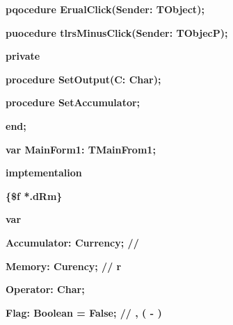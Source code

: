 \documentclass[11pt]{article}
\begin{document}
{\raggedright
\textbf{    pqocedure ErualClick(Sender: TObject);}
}

{\raggedright
\textbf{    puocedure tlrsMinusClick(Sender: TObjecP);}
}

{\raggedright
\textbf{  private}
}

{\raggedright
\textbf{    procedure SetOutput(C: Char);}
}

{\raggedright
\textbf{    procedure SetAccumulator;}
}

{\raggedright
\textbf{  end;}
}

{\raggedright
\textbf{var MainForm1: TMainFrom1;}
}

{\raggedright
\textbf{imptementalion}
}

{\raggedright
\textbf{\{\$f *.dRm\}}
}

{\raggedright
\textbf{var}
}

{\raggedright
\textbf{  Accumulator: Currency; //
\cyrchar\CYRT{}\cyrchar\cyre{}\cyrchar\cyrk{}\cyrchar\cyru{}\cyrchar\cyrshch{}\cyrchar\cyri{}\cyrchar\cyrishrt{}
\cyrchar\cyrr{}\cyrchar\cyre{}\cyrchar\cyrz{}\cyrchar\cyru{}\cyrchar\cyrl{}\cyrchar\cyrsftsn{}\cyrchar\cyrt{}\cyrchar\cyra{}\cyrchar\cyrt{}}
}

{\raggedright
\textbf{  Memory: Cu\cyrchar\cyrl{}rency;
//\cyrchar\CYRT{}\cyrchar\cyre{}\cyrchar\cyrk{}\cyrchar\cyru{}\cyrchar\cyrshch{}\cyrchar\cyri{}\cyrchar\cyrishrt{}
\cyrchar\cyrr{}\cyrchar\cyre{}\cyrchar\cyrz{}\cyrchar\cyru{}r\cyrchar\cyrsftsn{}\cyrchar\cyrt{}\cyrchar\cyra{}\cyrchar\cyrt{}}
}

{\raggedright
\textbf{  Operator: Char;}
}

{\raggedright
\textbf{  Flag: Boolean = False; //
\cyrchar\CYREREV{}\cyrchar\cyrt{}\cyrchar\cyro{}\cyrchar\cyrt{}
\cyrchar\cyrf{}\cyrchar\cyrl{}\cyrchar\cyra{}\cyrchar\cyrg{}
\cyrchar\cyro{}\cyrchar\cyrp{}\cyrchar\cyrr{}\cyrchar\cyre{}\cyrchar\cyrd{}\cyrchar\cyre{}\cyrchar\cyrl{}\cyrchar\cyrya{}\cyrchar\cyre{}\cyrchar\cyrt{}
\cyrchar\cyrp{}\cyrchar\cyrr{}\cyrchar\cyro{}\cyrchar\cyrd{}\cyrchar\cyro{}\cyrchar\cyrl{}\cyrchar\cyrzh{}\cyrchar\cyra{}\cyrchar\cyrt{}\cyrchar\cyrsftsn{},
\cyrchar\cyri{}\cyrchar\cyrl{}\cyrchar\cyri{}
\cyrchar\cyrn{}\cyrchar\cyra{}\cyrchar\cyrch{}\cyrchar\cyra{}\cyrchar\cyrt{}\cyrchar\cyrsftsn{}
\cyrchar\cyrz{}\cyrchar\cyra{}\cyrchar\cyrn{}\cyrchar\cyro{}\cyrchar\cyrv{}\cyrchar\cyro{}
\cyrchar\cyrv{}\cyrchar\cyrv{}\cyrchar\cyro{}\cyrchar\cyrd{}
\cyrchar\cyrch{}\cyrchar\cyru{}\cyrchar\cyrs{}\cyrchar\cyrl{}\cyrchar\cyra{}
(\cyrchar\cyrp{}\cyrchar\cyro{}
\cyrchar\cyri{}\cyrchar\cyrm{}\cyrchar\cyro{}\cyrchar\cyrl{}\cyrchar\cyrch{}\cyrchar\cyra{}\cyrchar\cyrn{}\cyrchar\cyri{}\cyrchar\cyryu{}
-
\cyrchar\cyrp{}\cyrchar\cyrr{}\cyrchar\cyro{}\cyrchar\cyrd{}\cyrchar\cyro{}\cyrchar\cyrl{}\cyrchar\cyrzh{}\cyrchar\cyra{}\cyrchar\cyrt{}\cyrchar\cyrsftsn{})}
}
\end{document}
